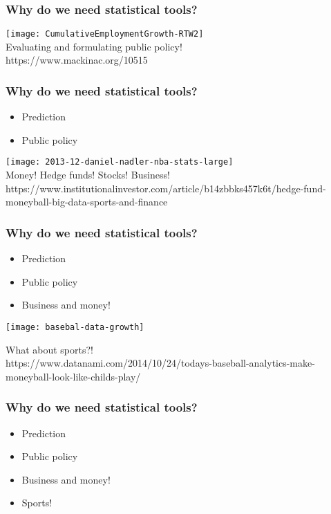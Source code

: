 \documentclass{beamer}
\begin{document}
\begin{frame}
\frametitle{Why do we need statistical tools?}




\centering
\texttt{[image: CumulativeEmploymentGrowth-RTW2]}\\
Evaluating and formulating public policy!\\
https://www.mackinac.org/10515

\end{frame}

\begin{frame}
\frametitle{Why do we need statistical tools?}
\begin{itemize}
\item Prediction
\item Public policy
\end{itemize}

\end{frame}

\begin{frame}


\centering
\texttt{[image: 2013-12-daniel-nadler-nba-stats-large]}\\
Money! Hedge funds! Stocks! Business!\\
https://www.institutionalinvestor.com/article/b14zbbks457k6t/hedge-fund-moneyball-big-data-sports-and-finance


\end{frame}

\begin{frame}
\frametitle{Why do we need statistical tools?}
\begin{itemize}
\item Prediction
\item Public policy
\item Business and money!
\end{itemize}
\end{frame}


\begin{frame}


\centering
\texttt{[image: basebal-data-growth]}

What about sports?!\\
https://www.datanami.com/2014/10/24/todays-baseball-analytics-make-moneyball-look-like-childs-play/
\end{frame}


\begin{frame}
\frametitle{Why do we need statistical tools?}
\begin{itemize}
\item Prediction
\item Public policy
\item Business and money!
\item Sports!
\end{itemize}

\end{frame}
\end{document}
